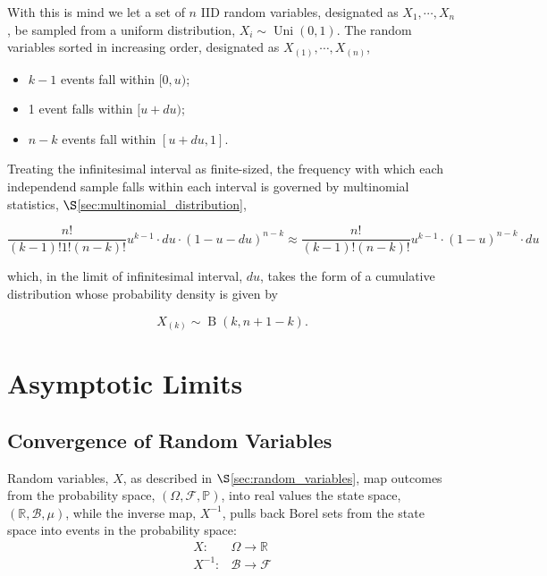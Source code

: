\documentclass[12pt, twoside, draft]{article}
\begin{document}
With this is mind we let a set of $n$ IID random variables, designated as $X_1, \cdots, X_n$, be sampled from a uniform distribution, $X_i \sim \operatorname{Uni}(0,1)$.  The random variables sorted in increasing order, designated as $X_{(1)}, \cdots, X_{(n)}$, 

\begin{itemize}[noitemsep]
\item $k-1$ events fall within $[0, u)$;
\item 1 event falls within $[u + du)$;
\item $n-k$ events fall within $[u+du, 1]$.
\end{itemize}

Treating the infinitesimal interval as finite-sized, the frequency with which each independend sample falls within each interval is governed by multinomial statistics, $\S$\ref{sec:multinomial_distribution}, 

\begin{equation}
\frac{n!}{(k-1)!1!(n-k)!}u^{k-1} \cdot du \cdot (1-u-du)^{n-k} \approx \frac{n!}{(k-1)!(n-k)!}u^{k-1} \cdot (1-u)^{n-k}\cdot du 
\end{equation}

which, in the limit of infinitesimal interval, $du$, takes the form of a cumulative distribution whose probability density is given by

\begin{equation}
X_{(k)} \sim \operatorname{B}(k, n+1-k).
\end{equation}


\section{Asymptotic Limits}\label{sec:asymptotic_limits}

\subsection{Convergence of Random Variables}\label{sec:convergence_random_variables}

Random variables, $X$, as described in $\S$\ref{sec:random_variables}, map outcomes from the probability space, $(\Omega, \mathcal{F}, \mathbb{P})$, into real values the state space, $(\mathbb{R}, \mathcal{B}, \mu)$, while the inverse map, $X^{-1}$, pulls back Borel sets from the state space into events in the probability space:
\begin{align}
X:& \Omega \rightarrow \mathbb{R} \\
X^{-1} :& \mathcal{B} \rightarrow \mathcal{F}
\end{align}
\end{document}
